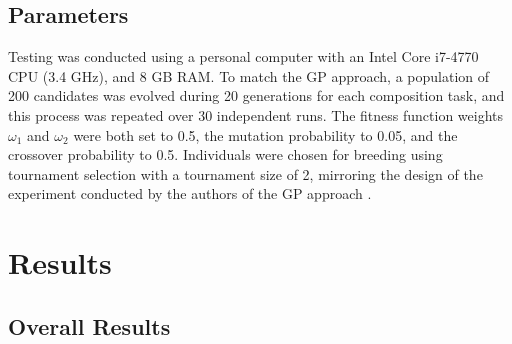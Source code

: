 \documentclass{article}
\begin{document}
\subsection{Parameters}
Testing was conducted using a personal computer with an Intel Core i7-4770 CPU (3.4 GHz), and 8 GB RAM. To match the GP approach, a population of 200 candidates was
evolved during 20 generations for each composition task, and this process was repeated over 30 independent runs. The fitness function weights $\omega_1$ and $\omega_2$
were both set to 0.5, the mutation probability to 0.05, and the crossover probability to 0.5. Individuals were chosen for breeding using tournament selection with a 
tournament size of 2, mirroring the design of the experiment conducted by the authors of the GP approach \cite{rodriguez2010composition}.

\section{Results}\label{results}

\subsection{Overall Results}
\end{document}
